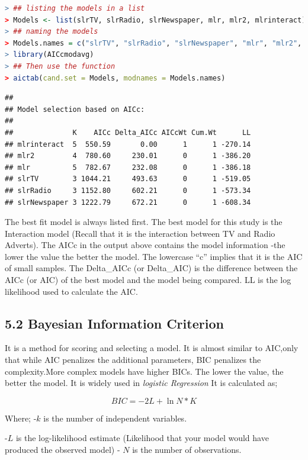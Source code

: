 \documentclass[
]{article}
\begin{document}
\begin{lstlisting}[language=R]
> ## listing the models in a list
> Models <- list(slrTV, slrRadio, slrNewspaper, mlr, mlr2, mlrinteract)
> ## naming the models
> Models.names = c("slrTV", "slrRadio", "slrNewspaper", "mlr", "mlr2", "mlrinteract")
> library(AICcmodavg)
> ## Then use the function
> aictab(cand.set = Models, modnames = Models.names)
\end{lstlisting}

\begin{lstlisting}
## 
## Model selection based on AICc:
## 
##              K    AICc Delta_AICc AICcWt Cum.Wt      LL
## mlrinteract  5  550.59       0.00      1      1 -270.14
## mlr2         4  780.60     230.01      0      1 -386.20
## mlr          5  782.67     232.08      0      1 -386.18
## slrTV        3 1044.21     493.63      0      1 -519.05
## slrRadio     3 1152.80     602.21      0      1 -573.34
## slrNewspaper 3 1222.79     672.21      0      1 -608.34
\end{lstlisting}

The best fit model is always listed first. The best model for this study
is the Interaction model (Recall that it is the interaction between TV
and Radio Adverts). The AICc in the output above contains the model
information -the lower the value the better the model. The lowercase
``c'' implies that it is the AIC of small samples. The Delta\_AICc (or
Delta\_AIC) is the difference between the AICc (or AIC) of the best
model and the model being compared. LL is the log likelihood used to
calculate the AIC.

\hypertarget{bayesian-information-criterion}{%
\subsection{5.2 Bayesian Information
Criterion}\label{bayesian-information-criterion}}

It is a method for scoring and selecting a model. It is almost similar
to AIC,only that while AIC penalizes the additional parameters, BIC
penalizes the complexity.More complex models have higher BICs. The lower
the value, the better the model. It is widely used in \emph{logistic
Regression} It is calculated as;

\[BIC=-2L+\ln{N}*K\]

Where; -\(k\) is the number of independent variables.

-\(L\) is the log-likelihood estimate (Likelihood that your model would
have produced the observed model) - \(N\) is the number of observations.
\end{document}
